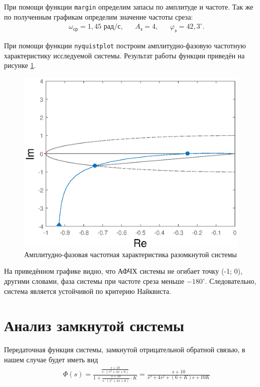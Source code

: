 \documentclass[fleqn, a4paper, 11pt, russian]{article}
\begin{document}
	При помощи функции \texttt{margin} определим запасы по амплитуде и частоте. Так же по полученным графикам определим значение частоты среза:
	\begin{align}
		&&\omega_\text{ср} = 1,45 \text{ рад/с}, &&A_\text{з} = 4, &&\varphi_\text{з} = 42,3^{\circ}.
	\end{align}
	
	При помощи функции \texttt{nyquistplot} построим амплитудно-фазовую частотную характеристику исследуемой системы. Результат работы функции приведён на рисунке \ref{opennyquist}.
	\begin{figure}[ht!]
		\centering
		\includegraphics[width = \textwidth]{Open/nyquist}
		\caption{Амплитудно-фазовая частотная характеристика разомкнутой системы}
		\label{opennyquist}
	\end{figure}
	
	На приведённом графике видно, что АФЧХ системы не огибает точку (-1; 0), другими словами, фаза системы при частоте среза меньше $-180^{\circ}.$ Следовательно, система является устойчивой по критерию Найквиста.
	\clearpage
	\section{Анализ замкнутой системы}
	Передаточная функция системы, замкнутой отрицательной обратной связью, в нашем случае будет иметь вид
	\begin{align}
		&&\Phi(s) = \frac{\displaystyle{\frac{s + 10}{s\cdot(s^2 + 4s + 6)}}}{1 + \displaystyle{\frac{s + 10}{s\cdot(s^2 + 4s + 6)}}\cdot K} = \frac{s + 10}{s^3 + 4s^2 + (6 + K)s + 10K}
	\end{align}
	
\end{document}
